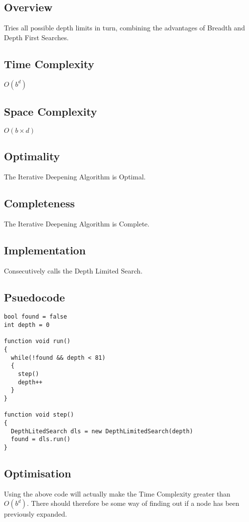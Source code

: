 \documentclass[10pt,letterpaper]{article}
\begin{document}
    \subsection{Overview}
      Tries all possible depth limits in turn, combining the advantages of Breadth and Depth First Searches.
    
    \subsection{Time Complexity}
      \(O(b^d)\)
      
    \subsection{Space Complexity}
      \(O(b\times d)\)
    
    \subsection{Optimality}
      The Iterative Deepening Algorithm is Optimal.
    
    \subsection{Completeness}
      The Iterative Deepening Algorithm is Complete.
    
    \subsection{Implementation}
      Consecutively calls the Depth Limited Search.
    
    \newpage
    \subsection{Psuedocode}
      \begin{verbatim}
bool found = false
int depth = 0

function void run()
{
  while(!found && depth < 81)
  {
    step()
    depth++
  }
}

function void step()
{
  DepthLitedSearch dls = new DepthLimitedSearch(depth)
  found = dls.run()
}
      \end{verbatim}
    \subsection{Optimisation}
      Using the above code will actually make the Time Complexity greater than \(O(b^d)\). There should therefore be some way of finding out if a node has been previously expanded.
  
\end{document}
